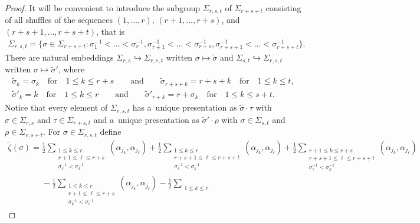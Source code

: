 \documentclass[11pt]{article}
\numberwithin{equation}{section}
\begin{document}
\begin{proof}
It will be convenient to introduce the subgroup $\Sigma_{r,s,t}$ of $\Sigma_{r+s+t}$ consisting of all shuf\/f\/les of the
sequences $(1,\ldots,r)$, $(r+1,\ldots,r+s)$, and $(r+s+1,\ldots,r+s+t)$, that is
\begin{gather*}
\Sigma_{r,s,t}=\big\{\sigma\in\Sigma_{r+s+t}: \sigma^{-1}_1<\dots<\sigma^{-1}_r, \sigma^{-1}_{r+1}<\dots<\sigma^{-1}_{r+s},
\sigma^{-1}_{r+s+1}<\dots<\sigma^{-1}_{r+s+t}\big\}.
\end{gather*}
There are natural embeddings $\Sigma_{r,s}\hookrightarrow\Sigma_{r,s,t}$ written $\sigma\mapsto\widetilde\sigma$ and
$\Sigma_{s,t}\hookrightarrow\Sigma_{r,s,t}$ written $\sigma\mapsto\widetilde\sigma'$, where
\begin{gather*}
\widetilde\sigma_k=\sigma_k
\quad
\text{for}
\quad
1\le k\le r+s
\qquad
\text{and}
\qquad
\widetilde\sigma_{r+s+k}=r+s+k
\quad
\text{for}
\quad
1\le k\le t,
\\
\widetilde\sigma'_k=k
\quad
\text{for}
\quad
1\le k\le r
\qquad
\text{and}
\qquad
\widetilde\sigma'_{r+k}=r+\sigma_k
\quad
\text{for}
\quad
1\le k\le s+t.
\end{gather*}
Notice that every element of $\Sigma_{r,s,t}$ has a~unique presentation as $\widetilde\sigma\cdot\tau$ with
$\sigma\in\Sigma_{r,s}$ and $\tau\in\Sigma_{r+s,t}$ and a~unique presentation as $\widetilde\sigma'\cdot\rho$ with
$\sigma\in\Sigma_{s,t}$ and $\rho\in\Sigma_{r,s+t}$.
For $\sigma\in\Sigma_{r,s,t}$ def\/ine
\begin{gather*}
\widetilde\zeta(\sigma)=\frac{1}{2}\sum\limits_{\substack{1\le k\le r
\\
r+1\le\ell\le r+s
\\
\sigma_\ell^{-1}<\sigma_k^{-1}}}(\alpha_{j_k},\alpha_{j_\ell}) +\frac{1}{2}\sum\limits_{\substack{1\le k\le r
\\
r+s+1\le\ell\le r+s+t
\\
\sigma_\ell^{-1}<\sigma_k^{-1}}}(\alpha_{j_k},\alpha_{j_\ell}) +\frac{1}{2}\sum\limits_{\substack{r+1\le k\le r+s
\\
r+s+1\le\ell\le r+s+t
\\
\sigma_\ell^{-1}<\sigma_k^{-1}}}(\alpha_{j_k},\alpha_{j_\ell})
\\
\phantom{\widetilde\zeta(\sigma)=}{}
 -\frac{1}{2}\sum\limits_{\substack{1\le k\le r
\\
r+1\le\ell\le r+s
\\
\sigma_k^{-1}<\sigma_\ell^{-1}}}(\alpha_{j_k},\alpha_{j_\ell}) -\frac{1}{2}\sum\limits_{\substack{1\le k\le r
}}
\end{gather*}
\end{proof}
\end{document}

